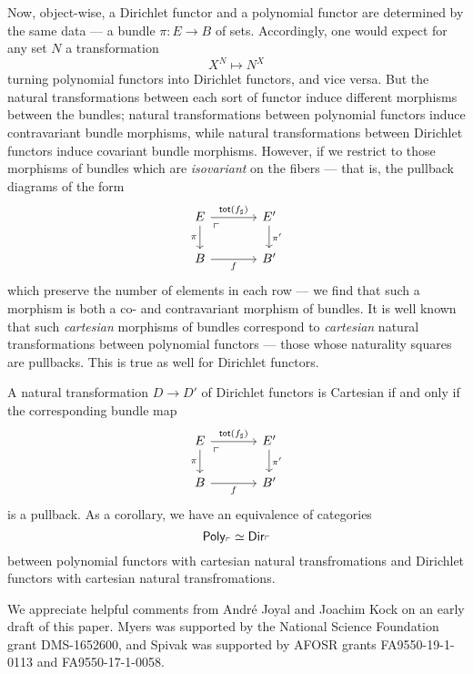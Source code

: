 Now, object-wise, a Dirichlet functor and a polynomial functor are determined by
the same data --- a bundle $\pi : E \to B$ of sets. Accordingly, one would
expect for any set $N$ a transformation
$$X^N \mapsto N^X$$
turning polynomial functors into Dirichlet functors, and vice versa. But the
natural transformations between each sort of functor induce different morphisms
between the bundles; natural transformations between polynomial functors induce
contravariant bundle morphisms, while natural transformations between Dirichlet
functors induce covariant bundle morphisms. However, if we restrict to those
morphisms of bundles which are \emph{isovariant} on the fibers --- that is, the
pullback diagrams of the form
\[
  \begin{tikzcd}[column sep=large]
E \arrow[r, "\term{tot}(f_{\sharp})"] \arrow[d, "\pi"'] \arrow[dr, phantom,
"\ulcorner" very near start] & E' \arrow[d, "\pi'"] \\
B \arrow[r, "f"']                                       & B'                  
\end{tikzcd}
\]
which preserve the number of elements in each row --- we find that such a morphism
is both a co- and contravariant morphism of bundles. It is well known that such
\emph{cartesian} morphisms of bundles correspond to \emph{cartesian} natural
transformations between polynomial functors \cite[Theorem 3.8]{kock2012polynomial} --- those whose naturality
squares are pullbacks. This is true as well for Dirichlet functors.
\begin{thm}
A natural transformation $D \to D'$ of Dirichlet functors is Cartesian if and
only if the corresponding bundle map
\[
  \begin{tikzcd}[column sep=large]
E \arrow[r, "\term{tot}(f_{\sharp})"] \arrow[d, "\pi"'] \arrow[dr, phantom,
"\ulcorner" very near start] & E' \arrow[d, "\pi'"] \\
B \arrow[r, "f"']                                       & B'                  
\end{tikzcd}
\]
is a pullback. As a corollary, we have an equivalence of categories
$$\mathsf{{Poly}}_{\ulcorner} \simeq \operatorname{\mathsf{{Dir}}}_{\ulcorner}$$
between polynomial functors with cartesian natural transfromations and Dirichlet
functors with cartesian natural transfromations.
\end{thm}



\begin{acknowledgements}
We appreciate helpful comments from Andr\'e Joyal and Joachim Kock on an early draft of this paper. Myers was supported by the National Science Foundation grant DMS-1652600, and Spivak was supported by AFOSR grants FA9550-19-1-0113 and FA9550-17-1-0058.
\end{acknowledgements}


